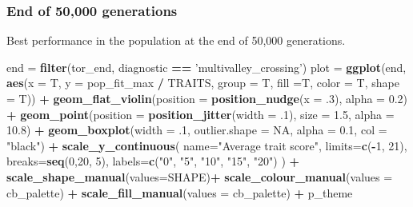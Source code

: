 \documentclass[]{book}
\newenvironment{Shaded}{\begin{snugshade}}{\end{snugshade}}
\newcommand{\DataTypeTok}[1]{\textcolor[rgb]{0.13,0.29,0.53}{#1}}
\newcommand{\DecValTok}[1]{\textcolor[rgb]{0.00,0.00,0.81}{#1}}
\newcommand{\FloatTok}[1]{\textcolor[rgb]{0.00,0.00,0.81}{#1}}
\newcommand{\KeywordTok}[1]{\textcolor[rgb]{0.13,0.29,0.53}{\textbf{#1}}}
\newcommand{\NormalTok}[1]{#1}
\newcommand{\OperatorTok}[1]{\textcolor[rgb]{0.81,0.36,0.00}{\textbf{#1}}}
\newcommand{\OtherTok}[1]{\textcolor[rgb]{0.56,0.35,0.01}{#1}}
\newcommand{\StringTok}[1]{\textcolor[rgb]{0.31,0.60,0.02}{#1}}
\begin{document}
\hypertarget{end-of-50000-generations-18}{%
\subsubsection{End of 50,000 generations}\label{end-of-50000-generations-18}}

Best performance in the population at the end of 50,000 generations.

\begin{Shaded}
\begin{Highlighting}[]
\NormalTok{end =}\StringTok{ }\KeywordTok{filter}\NormalTok{(tor_end, diagnostic }\OperatorTok{==}\StringTok{ 'multivalley_crossing'}\NormalTok{)}
\NormalTok{plot =}\StringTok{ }\KeywordTok{ggplot}\NormalTok{(end, }\KeywordTok{aes}\NormalTok{(}\DataTypeTok{x =}\NormalTok{ T, }\DataTypeTok{y =}\NormalTok{ pop_fit_max }\OperatorTok{/}\StringTok{ }\NormalTok{TRAITS, }\DataTypeTok{group =}\NormalTok{ T, }\DataTypeTok{fill =}\NormalTok{T, }\DataTypeTok{color =}\NormalTok{ T, }\DataTypeTok{shape =}\NormalTok{ T)) }\OperatorTok{+}
\StringTok{  }\KeywordTok{geom_flat_violin}\NormalTok{(}\DataTypeTok{position =} \KeywordTok{position_nudge}\NormalTok{(}\DataTypeTok{x =} \FloatTok{.3}\NormalTok{), }\DataTypeTok{alpha =} \FloatTok{0.2}\NormalTok{) }\OperatorTok{+}
\StringTok{  }\KeywordTok{geom_point}\NormalTok{(}\DataTypeTok{position =} \KeywordTok{position_jitter}\NormalTok{(}\DataTypeTok{width =} \FloatTok{.1}\NormalTok{), }\DataTypeTok{size =} \FloatTok{1.5}\NormalTok{, }\DataTypeTok{alpha =} \FloatTok{10.8}\NormalTok{) }\OperatorTok{+}
\StringTok{  }\KeywordTok{geom_boxplot}\NormalTok{(}\DataTypeTok{width =} \FloatTok{.1}\NormalTok{, }\DataTypeTok{outlier.shape =} \OtherTok{NA}\NormalTok{, }\DataTypeTok{alpha =} \FloatTok{0.1}\NormalTok{, }\DataTypeTok{col =} \StringTok{"black"}\NormalTok{) }\OperatorTok{+}
\StringTok{  }\KeywordTok{scale_y_continuous}\NormalTok{(}
    \DataTypeTok{name=}\StringTok{"Average trait score"}\NormalTok{,}
    \DataTypeTok{limits=}\KeywordTok{c}\NormalTok{(}\OperatorTok{-}\DecValTok{1}\NormalTok{, }\DecValTok{21}\NormalTok{),}
    \DataTypeTok{breaks=}\KeywordTok{seq}\NormalTok{(}\DecValTok{0}\NormalTok{,}\DecValTok{20}\NormalTok{, }\DecValTok{5}\NormalTok{),}
    \DataTypeTok{labels=}\KeywordTok{c}\NormalTok{(}\StringTok{"0"}\NormalTok{, }\StringTok{"5"}\NormalTok{, }\StringTok{"10"}\NormalTok{, }\StringTok{"15"}\NormalTok{, }\StringTok{"20"}\NormalTok{)}
\NormalTok{  ) }\OperatorTok{+}
\StringTok{  }\KeywordTok{scale_shape_manual}\NormalTok{(}\DataTypeTok{values=}\NormalTok{SHAPE)}\OperatorTok{+}
\StringTok{  }\KeywordTok{scale_colour_manual}\NormalTok{(}\DataTypeTok{values =}\NormalTok{ cb_palette) }\OperatorTok{+}
\StringTok{  }\KeywordTok{scale_fill_manual}\NormalTok{(}\DataTypeTok{values =}\NormalTok{ cb_palette) }\OperatorTok{+}
\StringTok{  }\NormalTok{p_theme}


\end{Highlighting}
\end{Shaded}
\end{document}
